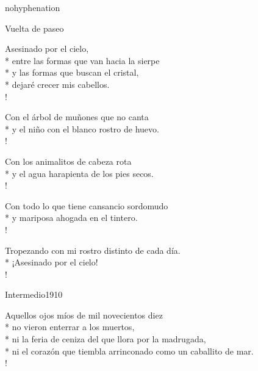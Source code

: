 \documentclass[
    a5paper,
    DIV=10,
    12pt,
    notitlepage,
    oneside,]
{scrbook} %
\begin{document}
\newpage

\maketoc

\renewcommand*{\topname}{Índice de poemas} %
\maketop

\nonumberpoems

\begin{hyphenrules}{nohyphenation} %



\begin{poem}{Vuelta de paseo}{}{\vspace{-1em}}

Asesinado por el cielo,\\*
entre las formas que van hacia la sierpe\\*
y las formas que buscan el cristal,\\*
dejaré crecer mis cabellos.\\!

Con el árbol de muñones que no canta\\*
y el niño con el blanco rostro de huevo.\\!

Con los animalitos de cabeza rota\\*
y el agua harapienta de los pies secos.\\!

Con todo lo que tiene cansancio sordomudo\\*
y mariposa ahogada en el tintero.\\!

Tropezando con mi rostro distinto de cada día.\\*
¡Asesinado por el cielo! \\!

\end{poem}

\begin{poem}{Intermedio}{1910}{}

Aquellos ojos míos de mil novecientos diez\\*
no vieron enterrar a los muertos,\\*
ni la feria de ceniza del que llora por la madrugada,\\*
ni el corazón que tiembla arrinconado como un caballito de mar.\\!


\end{poem}
\end{hyphenrules}
\end{document}
